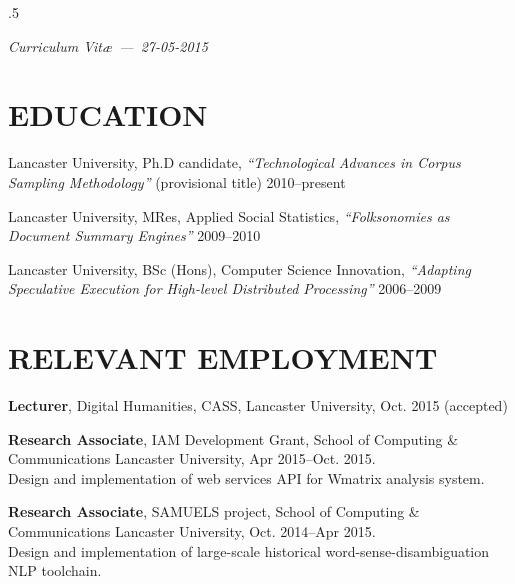 \documentclass{res}
\begin{document}
\thispagestyle{empty} %
\address{\\
\texttt{<steve@stephenwattam.com>}\\
\texttt{http://stephenwattam.com/}}


\begin{resume}
\vspace{0.2in}
\moveleft.5\sectionwidth\centerline{\it Curriculum Vit\ae~---~27-05-2015}

\section{EDUCATION}
\vspace{0.1in}


    Lancaster University, Ph.D candidate,
    \textit{``Technological Advances in Corpus Sampling Methodology''} (provisional title)
    2010--present

    Lancaster University, MRes,
    Applied Social Statistics,
    \textit{``Folksonomies as Document Summary \mbox{Engines}''}
    2009--2010

    Lancaster University, BSc (Hons),
    Computer Science Innovation,
    \textit{``Adapting Speculative Execution for High-level Distributed Processing''}
    2006--2009



\section{RELEVANT EMPLOYMENT}
\vspace{0.1in}

    {\bf Lecturer},
    Digital Humanities, CASS,
    Lancaster University,
    Oct. 2015 (accepted)

    {\bf Research Associate},
    IAM Development Grant, School of Computing \& Communications
    Lancaster University,
    Apr 2015--Oct. 2015.\\
    Design and implementation of web services API for Wmatrix analysis system.

    {\bf Research Associate},
    SAMUELS project, School of Computing \& Communications
    Lancaster University,
    Oct. 2014--Apr 2015.\\
    Design and implementation of large-scale historical word-sense-disambiguation NLP toolchain.



\end{resume}
\end{document}
